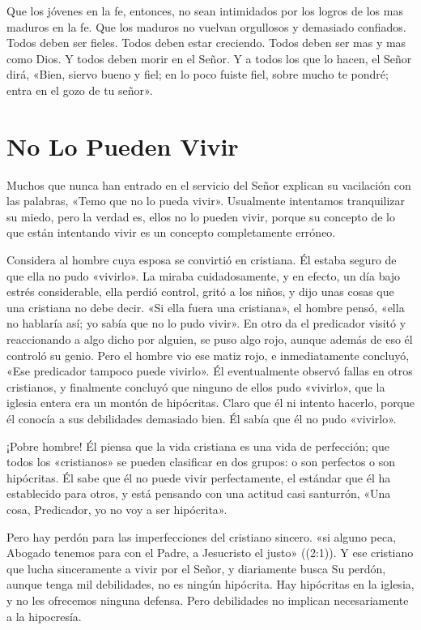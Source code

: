 \documentclass[12pt, twoside, openright]{book}
\begin{document}
Que los jóvenes en la fe, entonces, no sean intimidados por los logros de los mas maduros en la fe. Que los maduros no vuelvan orgullosos y demasiado confiados. Todos deben ser fieles. Todos deben estar creciendo. Todos deben ser mas y mas como Dios. Y todos deben morir en el Señor. Y a todos los que lo hacen, el Señor dirá, «Bien, siervo bueno y fiel; en lo poco fuiste fiel, sobre mucho te pondré; entra en el gozo de tu señor».

\section{No Lo Pueden Vivir}
Muchos que nunca han entrado en el servicio del Señor explican su vacilación con las palabras, «Temo que no lo pueda vivir». Usualmente intentamos tranquilizar su miedo, pero la verdad es, ellos no lo pueden vivir, porque su concepto de lo que están intentando vivir es un concepto completamente erróneo.

Considera al hombre cuya esposa se convirtió en cristiana. Él estaba seguro de que ella no pudo «vivirlo». La miraba cuidadosamente, y en efecto, un día bajo estrés considerable, ella perdió control, gritó a los niños, y dijo unas cosas que una cristiana no debe decir. «Si ella fuera una cristiana», el hombre pensó, «ella no hablaría así; yo sabía que no lo pudo vivir». En otro da el predicador visitó y reaccionando a algo dicho por alguien, se puso algo rojo, aunque además de eso él controló su genio. Pero el hombre vio ese matiz rojo, e inmediatamente concluyó, «Ese predicador tampoco puede vivirlo». Él eventualmente observó fallas en otros cristianos, y finalmente concluyó que ninguno de ellos pudo «vivirlo», que la iglesia entera era un montón de hipócritas. Claro que él ni intento hacerlo, porque él conocía a sus debilidades demasiado bien. Él sabía que él no pudo «vivirlo».

¡Pobre hombre! Él piensa que la vida cristiana es una vida de perfección; que todos los «cristianos» se pueden clasificar en dos grupos: o son perfectos o son hipócritas. Él sabe que él no puede vivir perfectamente, el estándar que él ha establecido para otros, y está pensando con una actitud casi santurrón, «Una cosa, Predicador, yo no voy a ser hipócrita».

Pero hay perdón para las imperfecciones del cristiano sincero. «si alguno peca, Abogado tenemos para con el Padre, a Jesucristo el justo» ((2:1)). Y ese cristiano que lucha sinceramente a vivir por el Señor, y diariamente busca Su perdón, aunque tenga mil debilidades, no es ningún hipócrita. Hay hipócritas en la iglesia, y no les ofrecemos ninguna defensa. Pero debilidades no implican necesariamente a la hipocresía. 
\end{document}
